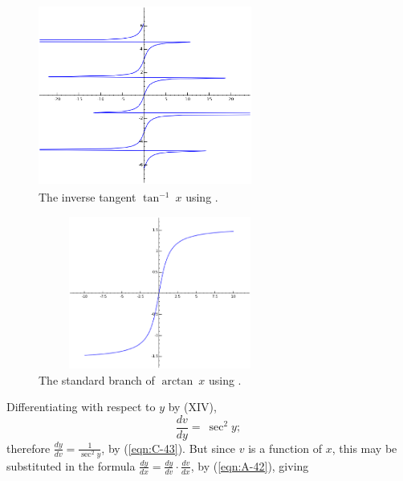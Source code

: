 \begin{figure}[h!]
\begin{minipage}{\textwidth}
\begin{center}
\includegraphics[height=6cm,width=7cm]{arctan2.eps}
\end{center}
\end{minipage}
\caption{The inverse tangent $\tan^{-1}\ x$ using \sage.}
\label{fig:arctan2}
\end{figure}

\begin{figure}[h!]
\begin{minipage}{\textwidth}
\begin{center}
\includegraphics[height=5cm,width=8cm]{arctan.eps}
\end{center}
\end{minipage}
\caption{The standard branch of $\arctan\ x$ using \sage.}
\label{fig:arctan}
\end{figure}

Differentiating with respect to $y$ by (XIV),
\[
  	\frac{dv}{dy} 	=\ \sec^2 y;
\]
therefore $\frac{dy}{dv} 	= \frac{1}{\sec^2 y}$, by (\ref{eqn:C-43}). %
But since $v$ is a function of $x$, this may be substituted in the formula
$\frac{dy}{dx} 	= \frac{dy}{dv} \cdot \frac{dv}{dx}$, by (\ref{eqn:A-42}),%
giving 	

